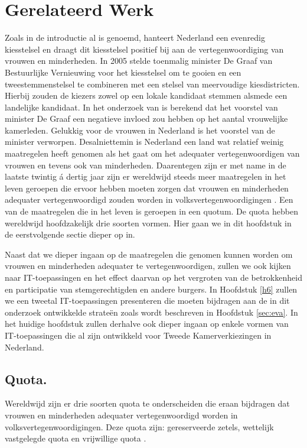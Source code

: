 \section{Gerelateerd Werk}
\label{sec:rel}
Zoals in de introductie al is genoemd, hanteert Nederland een evenredig kiesstelsel en draagt dit kiesstelsel positief bij aan de vertegenwoordiging van vrouwen en minderheden. In 2005 stelde toenmalig minister De Graaf van Bestuurlijke Vernieuwing voor het kiesstelsel om te gooien en een tweestemmenstelsel te combineren met een stelsel van meervoudige kiesdistricten. Hierbij zouden de kiezers zowel op een lokale kandidaat stemmen alsmede een landelijke kandidaat. In het onderzoek van \cite{norris2006impact} is berekend dat het voorstel van minister De Graaf een negatieve invloed zou hebben op het aantal vrouwelijke kamerleden. Gelukkig voor de vrouwen in Nederland is het voorstel van de minister verworpen. Desalniettemin is Nederland een land wat relatief weinig maatregelen heeft genomen als het gaat om het adequater vertegenwoordigen van vrouwen en tevens ook van minderheden. Daarentegen zijn er met name in de laatste twintig á dertig jaar zijn er wereldwijd steeds meer maatregelen in het leven geroepen die ervoor hebben moeten zorgen dat vrouwen en minderheden adequater vertegenwoordigd zouden worden in volksvertegenwoordigingen \citep{norris2007opening}. Een van de maatregelen die in het leven is geroepen in een quotum. De quota hebben wereldwijd hoofdzakelijk drie soorten vormen. Hier gaan we in dit hoofdstuk in de eerstvolgende sectie dieper op in.

Naast dat we dieper ingaan op de maatregelen die genomen kunnen worden om vrouwen en minderheden adequater te vertegenwoordigen, zullen we ook kijken naar IT-toepassingen en het effect daarvan op het vergroten van de betrokkenheid en participatie van stemgerechtigden en andere burgers. In Hoofdstuk \ref{h6} zullen we een tweetal IT-toepassingen presenteren die moeten bijdragen aan de in dit onderzoek ontwikkelde strate\"{e}n zoals wordt beschreven in Hoofdstuk \ref{sec:eva}. In het huidige hoofdstuk zullen derhalve ook dieper ingaan op enkele vormen van IT-toepassingen die al zijn ontwikkeld voor Tweede Kamerverkiezingen in Nederland. 

\subsection{Quota.} 
Wereldwijd zijn er drie soorten quota te onderscheiden die eraan bijdragen dat vrouwen en minderheden adequater vertegenwoordigd worden in volksvertegenwoordigingen. Deze quota zijn:  gereserveerde zetels, wettelijk vastgelegde quota en vrijwillige quota \citep{norris2007opening}. 

